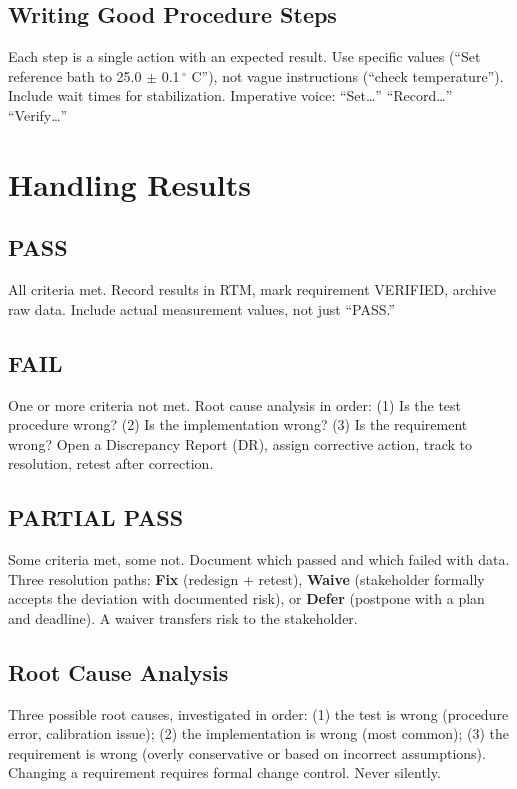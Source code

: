 \subsection{Writing Good Procedure Steps}
Each step is a single action with an expected result. Use specific values (``Set reference bath to 25.0 $\pm$ 0.1\,$^{\circ}$ C''), not vague instructions (``check temperature''). Include wait times for stabilization. Imperative voice: ``Set\ldots'' ``Record\ldots'' ``Verify\ldots''

\section{Handling Results}


\subsection{PASS}
All criteria met. Record results in RTM, mark requirement VERIFIED, archive raw data. Include actual measurement values, not just ``PASS.''

\subsection{FAIL}
One or more criteria not met. Root cause analysis in order: (1) Is the test procedure wrong? (2) Is the implementation wrong? (3) Is the requirement wrong? Open a Discrepancy Report (DR), assign corrective action, track to resolution, retest after correction.

\subsection{PARTIAL PASS}
Some criteria met, some not. Document which passed and which failed with data. Three resolution paths: \textbf{Fix} (redesign + retest), \textbf{Waive} (stakeholder formally accepts the deviation with documented risk), or \textbf{Defer} (postpone with a plan and deadline). A waiver transfers risk to the stakeholder.

\subsection{Root Cause Analysis}
Three possible root causes, investigated in order: (1) the test is wrong (procedure error, calibration issue); (2) the implementation is wrong (most common); (3) the requirement is wrong (overly conservative or based on incorrect assumptions). Changing a requirement requires formal change control. Never silently.

